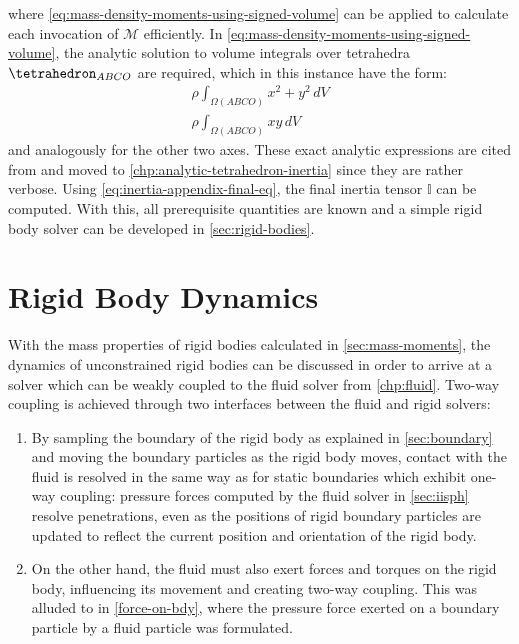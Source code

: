 \documentclass[oneside, a4paper]{book}
\newcommand\br[1]{\left(#1\right)}
\begin{document}
    where \autoref{eq:mass-density-moments-using-signed-volume} can be applied to calculate each invocation of $\mathcal{M}$ efficiently. In \autoref{eq:mass-density-moments-using-signed-volume}, the analytic solution to volume integrals over tetrahedra $\tetrahedron_{ABCO}$ are required, which in this instance have the form:
    \begin{align}
      \rho \int_{\Omega\br{ABCO}} x^2+y^2\, dV\\
      \rho \int_{\Omega\br{ABCO}} xy\, dV
    \end{align}
    and analogously for the other two axes. These exact analytic expressions are cited from \autocite[Tonon]{explicit-exact-tetrahedron-formulas} and moved to \autoref{chp:analytic-tetrahedron-inertia} since they are rather verbose. Using \autoref{eq:inertia-appendix-final-eq}, the final inertia tensor $\mathds{I}$ can be computed. With this, all prerequisite quantities are known and a simple rigid body solver can be developed in \autoref{sec:rigid-bodies}.


    \section{Rigid Body Dynamics}\label{sec:rigid-bodies}
    With the mass properties of rigid bodies calculated in \autoref{sec:mass-moments}, the dynamics of unconstrained rigid bodies can be discussed in order to arrive at a solver which can be weakly coupled to the fluid solver from \autoref{chp:fluid}. Two-way coupling is achieved through two interfaces between the fluid and rigid solvers:
    \begin{enumerate}
      \item By sampling the boundary of the rigid body as explained in \autoref{sec:boundary} and moving the boundary particles as the rigid body moves, contact with the fluid is resolved in the same way as for static boundaries which exhibit one-way coupling: pressure forces computed by the fluid solver in \autoref{sec:iisph} resolve penetrations, even as the positions of rigid boundary particles are updated to reflect the current position and orientation of the rigid body.
      \item On the other hand, the fluid must also exert forces and torques on the rigid body, influencing its movement and creating two-way coupling. This was alluded to in \autoref{force-on-bdy}, where the pressure force exerted on a boundary particle by a fluid particle was formulated.
    \end{enumerate}
\end{document}
